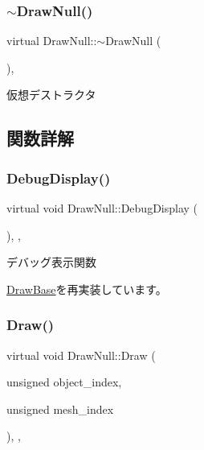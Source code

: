 \subsubsection{\texorpdfstring{$\sim$\+Draw\+Null()}{~DrawNull()}}
{\footnotesize\ttfamily virtual Draw\+Null\+::$\sim$\+Draw\+Null (\begin{DoxyParamCaption}{ }\end{DoxyParamCaption})\hspace{0.3cm}{\ttfamily [inline]}, {\ttfamily [virtual]}}



仮想デストラクタ 



\subsection{関数詳解}
\mbox{\label{class_draw_null_aa78d05c51ff3943888678b9b2c6bd027}} 
\subsubsection{\texorpdfstring{Debug\+Display()}{DebugDisplay()}}
{\footnotesize\ttfamily virtual void Draw\+Null\+::\+Debug\+Display (\begin{DoxyParamCaption}{ }\end{DoxyParamCaption})\hspace{0.3cm}{\ttfamily [inline]}, {\ttfamily [override]}, {\ttfamily [virtual]}}



デバッグ表示関数 



\mbox{\hyperlink{class_draw_base_a2ba175f791ee01508ffb2be24c68fe7f}{Draw\+Base}}を再実装しています。

\mbox{\label{class_draw_null_afe50f6fd820b18d673f70f048743f339}} 
\subsubsection{\texorpdfstring{Draw()}{Draw()}}
{\footnotesize\ttfamily virtual void Draw\+Null\+::\+Draw (\begin{DoxyParamCaption}\item[{unsigned}]{object\+\_\+index,  }\item[{unsigned}]{mesh\+\_\+index }\end{DoxyParamCaption})\hspace{0.3cm}{\ttfamily [inline]}, {\ttfamily [override]}, {\ttfamily [virtual]}}



